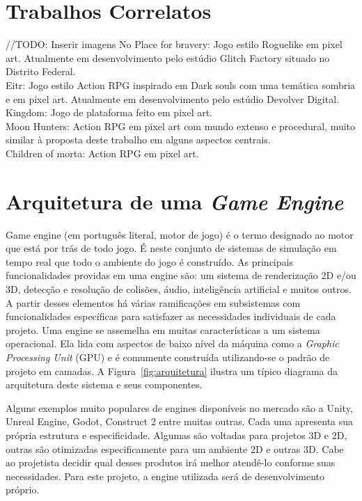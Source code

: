 \documentclass[12pt, 
openright, 
oneside, 
a4paper,    
brazil]{facom-ufu-abntex2}
\begin{document}
\chapter{Trabalhos Correlatos}
\label{sec:trabcorr}

//TODO: Inserir imagens
No Place for bravery: Jogo estilo Roguelike em pixel art. Atualmente em desenvolvimento pelo estúdio Glitch Factory situado no Distrito Federal.\\

Eitr: Jogo estilo Action RPG inspirado em Dark souls com uma temática sombria e em pixel art. Atualmente em desenvolvimento pelo estúdio Devolver Digital.\\

Kingdom: Jogo de plataforma feito em pixel art. \\

Moon Hunters: Action RPG em pixel art com mundo extenso e procedural, muito similar à proposta deste trabalho em alguns aspectos centrais. \\

Children of morta: Action RPG em pixel art. \\



\chapter{Arquitetura de uma \textit{Game Engine}}
Game engine (em português literal, motor de jogo) é o termo designado ao motor que está por trás de todo jogo. É neste conjunto de sistemas de simulação em tempo real que todo o ambiente do jogo é construído. As principais funcionalidades providas em uma engine são: um sistema de renderização 2D e/ou 3D, detecção e resolução de colisões, áudio, inteligência artificial e muitos outros. A partir desses elementos há várias ramificações em subsistemas com funcionalidades específicas para satisfazer as necessidades individuais de cada projeto. Uma engine se assemelha em muitas características a um sistema operacional. Ela lida com aspectos de baixo nível da máquina como a \textit{Graphic Processing Unit} (GPU) e é comumente construída utilizando-se o padrão de projeto em camadas. A Figura~\ref{fig:arquitetura}  ilustra um típico diagrama da arquitetura deste sistema e seus componentes.

Alguns exemplos muito populares de engines disponíveis no mercado são a Unity, Unreal Engine, Godot, Construct 2 entre muitas outras. Cada uma apresenta sua própria estrutura e especificidade. Algumas são voltadas para projetos 3D e 2D, outras são otimizadas especificamente para um ambiente 2D e outras 3D. Cabe ao projetista decidir qual desses produtos irá melhor atendê-lo conforme suas necessidades. Para este projeto, a engine utilizada será de desenvolvimento próprio.
\end{document}
